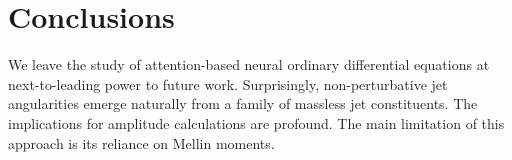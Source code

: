 \section{Conclusions}\label{sec:conclusions}

We leave the study of attention-based neural ordinary differential
equations at next-to-leading power to future work. Surprisingly,
non-perturbative jet angularities emerge naturally from a family of
massless jet constituents. The implications for amplitude calculations
are profound. The main limitation of this approach is its reliance on
Mellin moments.

